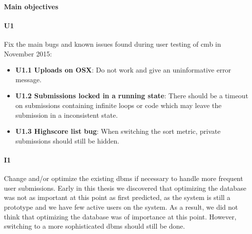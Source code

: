 \paragraph*{Main objectives} \hfill

\paragraph*{U1} Fix the main bugs and known issues found during user testing of \gls{cmb} in November 2015:
  \begin{itemize}
    \item \textbf{U1.1 Uploads on OSX}: Do not work and give an uninformative error message.
    \item \textbf{U1.2 Submissions locked in a running state}: There should be a timeout on submissions containing infinite loops or code which may leave the submission in a inconsistent state.
    \item \textbf{U1.3 Highscore list bug}: When switching the sort metric, private submissions should still be hidden.
  \end{itemize}

\paragraph*{I1} Change and/or optimize the existing \gls{dbms} if necessary to handle more frequent user submissions. Early in this thesis we discovered that optimizing the database was not as important at this point as first predicted, as the system is still a prototype and we have few active users on the system. As a result, we did not think that optimizing the database was of importance at this point. However, switching to a more sophisticated \gls{dbms} should still be done.

